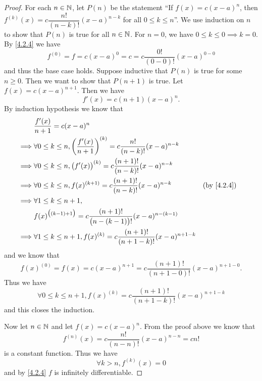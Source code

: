 \begin{proof}
  For each \(n \in \mathbb{N}\), let \(P(n)\) be the statement ``If \(f(x) = c (x - a)^n\), then \(f^{(k)}(x) = c \dfrac{n!}{(n - k)!} (x - a)^{n - k}\) for all \(0 \leq k \leq n\)''.
  We use induction on \(n\) to show that \(P(n)\) is true for all \(n \in \mathbb{N}\).
  For \(n = 0\), we have \(0 \leq k \leq 0 \implies k = 0\).
  By \cref{4.2.4} we have
  \[
    f^{(0)} = f = c (x - a)^0 = c = c \dfrac{0!}{(0 - 0)!} (x - a)^{0 - 0}
  \]
  and thus the base case holds.
  Suppose inductive that \(P(n)\) is true for some \(n \geq 0\).
  Then we want to show that \(P(n + 1)\) is true.
  Let \(f(x) = c (x - a)^{n + 1}\).
  Then we have
  \[
    f'(x) = c (n + 1) (x - a)^n.
  \]
  By induction hypothesis we know that
  \begin{align*}
             & \dfrac{f'(x)}{n + 1} = c (x - a)^n                                                                                                     \\
    \implies & \forall 0 \leq k \leq n, \bigg(\dfrac{f'(x)}{n + 1}\bigg)^{(k)} = c \dfrac{n!}{(n - k)!} (x - a)^{n - k}                               \\
    \implies & \forall 0 \leq k \leq n, \big(f'(x)\big)^{(k)} = c \dfrac{(n + 1)!}{(n - k)!} (x - a)^{n - k}                                          \\
    \implies & \forall 0 \leq k \leq n, f(x)^{(k + 1)} = c \dfrac{(n + 1)!}{(n - k)!} (x - a)^{n - k}                   &  & \text{(by \cref{4.2.4})} \\
    \implies & \forall 1 \leq k \leq n + 1,                                                                                                           \\
             & f(x)^{\big((k - 1) + 1\big)} = c \dfrac{(n + 1)!}{\big(n - (k - 1)\big)!} (x - a)^{n - (k - 1)}                                        \\
    \implies & \forall 1 \leq k \leq n + 1, f(x)^{(k)} = c \dfrac{(n + 1)!}{(n + 1 - k)!} (x - a)^{n + 1 - k}
  \end{align*}
  and we know that
  \[
    f(x)^{(0)} = f(x) = c (x - a)^{n + 1} = c \dfrac{(n + 1)!}{(n + 1 - 0)!} (x - a)^{n + 1 - 0}.
  \]
  Thus we have
  \[
    \forall 0 \leq k \leq n + 1, f(x)^{(k)} = c \dfrac{(n + 1)!}{(n + 1 - k)!} (x - a)^{n + 1 - k}
  \]
  and this closes the induction.

  Now let \(n \in \mathbb{N}\) and let \(f(x) = c (x - a)^n\).
  From the proof above we know that
  \[
    f^{(n)}(x) = c \dfrac{n!}{(n - n)!} (x - a)^{n - n} = c n!
  \]
  is a constant function.
  Thus we have
  \[
    \forall k > n, f^{(k)}(x) = 0
  \]
  and by \cref{4.2.4} \(f\) is infinitely differentiable.
\end{proof}

